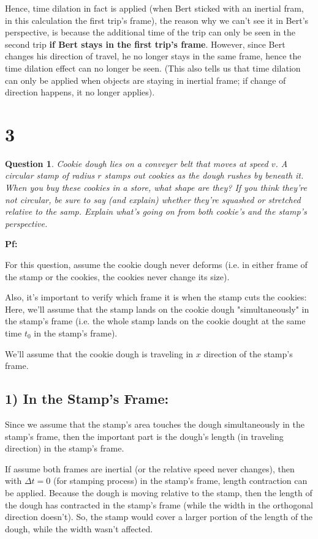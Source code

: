 \documentclass{article}
\newtheorem{question}{Question}
\begin{document}
Hence, time dilation in fact is applied (when Bert sticked with an inertial fram, in this calculation the first trip's frame), the reason why we can't see it in Bert's perspective, is because the additional time of the trip can only be seen in the second trip \textbf{if Bert stays in the first trip's frame}. However, since Bert changes his direction of travel, he no longer stays in the same frame, hence the time dilation effect can no longer be seen. (This also tells us that time dilation can only be applied when objects are staying in inertial frame; if change of direction happens, it no longer applies).

\break

\section*{3}
\begin{question}\label{q3}
    Cookie dough lies on a conveyer belt that moves at speed $v$. A circular stamp of radius $r$ stamps out cookies as the dough rushes by beneath it. When you buy these cookies in a store, what shape are they? If you think they're not circular, be sure to say (and explain) whether they're squashed or stretched relative to the samp. Explain what's going on from both cookie's and the stamp's perspective.
\end{question}

\textbf{Pf:}

For this question, assume the cookie dough never deforms (i.e. in either frame of the stamp or the cookies, the cookies never change its size). 

Also, it's important to verify which frame it is when the stamp cuts the cookies: Here, we'll assume that the stamp lands on the cookie dough "simultaneously" in the stamp's frame (i.e. the whole stamp lands on the cookie dought at the same time $t_0$ in the stamp's frame).

We'll assume that the cookie dough is traveling in $x$ direction of the stamp's frame.

\subsection*{1) In the Stamp's Frame:}
Since we assume that the stamp's area touches the dough simultaneously in the stamp's frame, then the important part is the dough's length (in traveling direction) in the stamp's frame. 

If assume both frames are inertial (or the relative speed never changes), then with $\Delta t=0$ (for stamping process) in the stamp's frame, length contraction can be applied. Because the dough is moving relative to the stamp, then the length of the dough has contracted in the stamp's frame (while the width in the orthogonal direction doesn't). So, the stamp would cover a larger portion of the length of the dough, while the width wasn't affected. 
\end{document}
